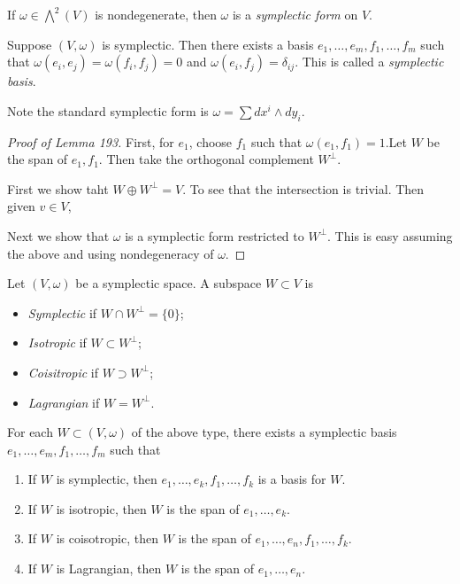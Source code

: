 \documentclass[twoside, 10pt]{article}
\begin{document}
    \begin{defn} If $\omega \in \bigwedge^2(V)$ is nondegenerate, then $\omega$
    is a \textit{symplectic form} on $V$.  \end{defn}

    \begin{lem} Suppose $(V,\omega)$ is symplectic. Then there exists a basis
        $e_1, \ldots, e_m, f_1, \ldots, f_m$ such that $\omega(e_i,e_j) =
        \omega(f_i,f_j) = 0$ and $\omega(e_i,f_j) = \delta_{ij}$. This is
        called a \textit{symplectic basis}.  \end{lem}

    Note the standard symplectic form is $\omega = \sum dx^i \wedge dy_i$.

    \begin{proof}[Proof of Lemma 193] First, for $e_1$, choose $f_1$ such that
        $\omega(e_1,f_1) = 1. $Let $W$ be the span of $e_1,f_1$. Then take the
        orthogonal complement $W^{\perp}$.

        First we show taht $W \oplus W^{\perp} = V$. To see that the
        intersection is trivial. Then given $v \in V$, 

        Next we show that $\omega$ is a symplectic form restricted to
    $W^{\perp}$. This is easy assuming the above and using nondegeneracy of
$\omega$.  \end{proof}

    \begin{defn} Let $(V,\omega)$ be a symplectic space. A subspace $W \subset
        V$ is \begin{itemize} \item \textit{Symplectic} if $W \cap W^{\perp} =
            \{0\}$; \item \textit{Isotropic} if $W \subset W^{\perp}$; \item
            \textit{Coisitropic} if $W \supset W^{\perp}$; \item
    \textit{Lagrangian} if $W = W^{\perp}$.  \end{itemize} \end{defn}

    \begin{exer}[Hw4 Problem 12-9] For each $W \subset (V,\omega)$ of the above
        type, there exists a symplectic basis $e_1, \ldots, e_m, f_1, \ldots,
        f_m$ such that \begin{enumerate} \item If $W$ is symplectic, then $e_1,
            \ldots, e_k, f_1, \ldots, f_k$ is a basis for $W$.  \item If $W$ is
            isotropic, then $W$ is the span of $e_1, \ldots, e_k$.  \item If
            $W$ is coisotropic, then $W$ is the span of $e_1, \ldots, e_n, f_1,
            \ldots, f_k$.  \item If $W$ is Lagrangian, then $W$ is the span of
            $e_1, \ldots, e_n$.  \end{enumerate} \end{exer}
\end{document}
